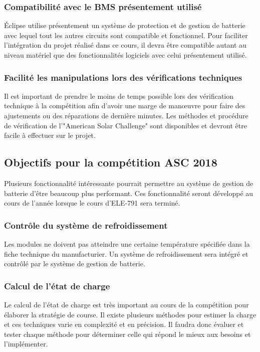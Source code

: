 		\subsubsection{Compatibilité avec le BMS présentement utilisé}
		Éclipse utilise présentement un système de protection et de gestion de batterie avec lequel tout les autres circuits sont compatible et fonctionnel. Pour faciliter l'intégration du projet réalisé dans ce cours, il devra être compatible autant au niveau matériel que des fonctionnalités logiciels avec celui présentement utilisé.		
		
		\subsubsection{Facilité les manipulations lors des vérifications techniques}
		Il est important de prendre le moins de temps possible lors des vérification technique à la compétition afin d'avoir une marge de manœuvre pour faire des ajustements ou des réparations de dernière minutes. Les méthodes et procédure de vérification de l'"American Solar Challenge" sont disponibles et devront être facile à effectuer sur le projet.
		
	\subsection{Objectifs pour la compétition ASC 2018}
	Plusieurs fonctionnalité intéressante pourrait permettre au système de gestion de batterie d'être beaucoup plus performant. Ces fonctionnalité seront développé au cours de l'année lorsque le cours d'ELE-791 sera terminé. 
	
	\subsubsection{Contrôle du système de refroidissement}
	Les modules ne doivent pas atteindre une certaine température spécifiée dans la fiche technique du manufacturier. Un système de refroidissement sera intégré et contrôlé par le système de gestion de batterie. 
	
	\subsubsection{Calcul de l'état de charge}
	Le calcul de l'état de charge est très important au cours de la compétition pour élaborer la stratégie de course. Il existe plusieurs méthodes pour estimer la charge et ces techniques varie en complexité et en précision. Il faudra donc évaluer et tester chaque méthode pour déterminer celle qui répond le mieux aux besoins et l'implémenter. 
	
